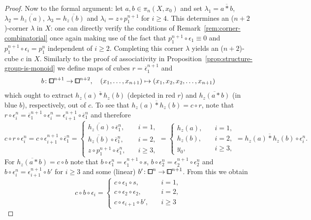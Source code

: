 \begin{proof}
Now to the formal argument:
let $a,b\in\pi_n(X,x_0)$ and set $\lambda_1 = \overline{a*b}$, $\lambda_2 = \overline{h_z(a)}$, $\lambda_3 = \overline{h_z(b)}$ and $\lambda_i = z\circ p_1^{n+1}$ for $i\geq 4$.
This determines an ($n+2$)-corner $\lambda$ in $X$:
one can directly verify the conditions of Remark~\ref{rem:corner-combinatorial} once again making use of the fact that
$p_1^{n+1}\circ\epsilon_1 \equiv 0$ and $p_1^{n+1}\circ\epsilon_i = p_1^n$ independent of $i\geq 2$.
Completing this corner $\lambda$ yields an ($n+2$)-cube $c$ in $X$.
Similarly to the proof of associativity in Proposition~\ref{prop:structure-group-is-monoid}
we define maps of cubes $r = \overline{\epsilon}_1^{n+1}$ and
\[
    b\colon{\bbox}^{n+1}\to{\bbox}^{n+2},\quad (x_1,\ldots,x_{n+1})\mapsto(x_1,x_2,x_2,\ldots,x_{n+1})
\]
which ought to extract $\overline{h_z(a)*h_z(b)}$ (depicted in red $r$) and $\overline{h_z(a*b)}$ (in blue $b$), respectively, out of $c$.
To see that $\overline{h_z(a)*h_z(b)} = c\circ r$, note that $r\circ\epsilon_i^n = \overline{\epsilon}_1^{n+1}\circ\epsilon_i^n = \epsilon_{i+1}^{n+1}\circ\overline{\epsilon}_1^n$ and therefore
\[
    c\circ r\circ\epsilon_i^n = c\circ\epsilon_{i+1}^{n+1}\circ\overline{\epsilon}_1^n
    = \begin{cases}
        \overline{h_z(a)}\circ\overline{\epsilon}_1^n,\quad & i = 1, \\
        \overline{h_z(b)}\circ\overline{\epsilon}_1^n,\quad & i = 2, \\
        z\circ p_1^{n+1}\circ\overline{\epsilon}_1^n,\quad & i\geq 3,
    \end{cases}
    = \begin{cases}
        h_z(a),\quad & i = 1, \\
        h_z(b),\quad & i = 2, \\
        y_0,\quad & i\geq 3,
    \end{cases}
    = \overline{h_z(a)*h_z(b)}\circ\epsilon_i^n.
\]
For $\overline{h_z(a*b)} = c\circ b$ note that $b\circ\epsilon_1^n =\epsilon_1^{n+1}\circ s$,
$b\circ\epsilon_2^n = \epsilon_2^{n+1}\circ\epsilon_2^n$ and $b\circ\epsilon_i^n = \epsilon_{i+1}^{n+1}\circ b'$ for $i\geq 3$ and some (linear) $b'\colon{\bbox}^n\to{\bbox}^{n+1}$.
From this we obtain
\[
    c\circ b\circ\epsilon_i =
    \begin{cases}
        c\circ\epsilon_1\circ s,\quad & i = 1, \\
        c\circ\epsilon_2\circ\epsilon_2,\quad & i = 2, \\
        c\circ\epsilon_{i+1}\circ b',\quad & i\geq 3

\end{cases}\]
\end{proof}
